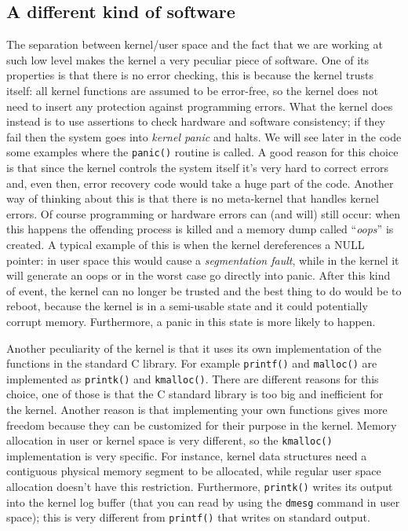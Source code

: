 \documentclass[10pt]{book}
\begin{document}
\subsection{A different kind of software} The separation between kernel/user space and the fact that we are working at such low level makes the kernel a very peculiar piece of software. One of its properties is that there is no error checking, this is because the kernel trusts itself: all kernel functions are assumed to be error-free, so the kernel does not need to insert any protection against programming errors\cite{cesati}. What the kernel does instead is to use assertions to check hardware and software consistency; if they fail then the system goes into \textit{kernel panic} and halts. We will see later in the code some examples where the \verb|panic()| routine is called. A good reason for this choice is that since the kernel controls the system itself it's very hard to correct errors and, even then, error recovery code would take a huge part of the code. Another way of thinking about this is that there is no meta-kernel that handles kernel errors. Of course programming or hardware errors can (and will) still occur: when this happens the offending process is killed and a memory dump called ``\textit{oops}'' is created. A typical example of this is when the kernel dereferences a NULL pointer: in user space this would cause a \textit{segmentation fault}, while in the kernel it will generate an oops or in the worst case go directly into panic. After this kind of event, the kernel can no longer be trusted and the best thing to do would be to reboot, because the kernel is in a semi-usable state and it could potentially corrupt memory. Furthermore, a panic in this state is more likely to happen. %

Another peculiarity of the kernel is that it uses its own implementation of the functions in the standard C library. For example \verb|printf()| and \verb|malloc()| are implemented as \verb|printk()| and \verb|kmalloc()|. There are different reasons for this choice, one of those is that the C standard library is too big and inefficient for the kernel. Another reason is that implementing your own functions gives more freedom because they can be customized for their purpose in the kernel. Memory allocation in user or kernel space is very different, so the \verb|kmalloc()| implementation is very specific. For instance, kernel data structures need a contiguous physical memory segment to be allocated, while regular user space allocation doesn't have this restriction. Furthermore, \verb|printk()| writes its output into the kernel log buffer (that you can read by using the \verb|dmesg| command in user space); this is very different from \verb|printf()| that writes on standard output.
\end{document}
